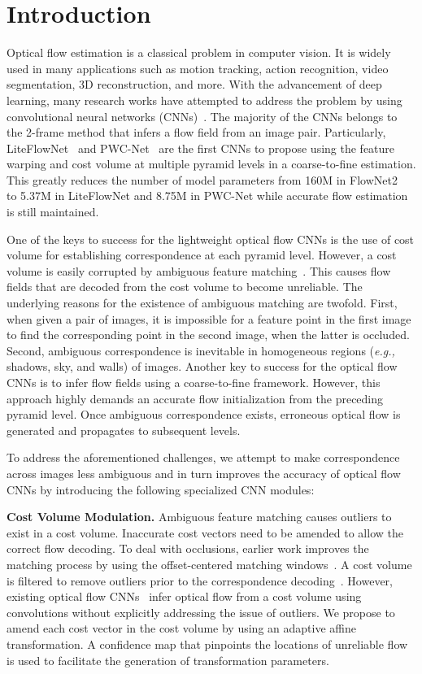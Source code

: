 \documentclass[runningheads]{llncs}
\newcommand{\eg}{\emph{e.g., }}
\begin{document}
\section{Introduction}
Optical flow estimation is a classical problem in computer vision. It is widely used in many applications such as motion tracking, action recognition, video segmentation, 3D reconstruction, and more. 
With the advancement of deep learning, many research works have attempted to address the problem by using convolutional neural networks (CNNs)~\cite{Hui18,Hui20,Hur19,Ilg17,Liu19,Sun18,Sun19,Yang19,Yin19}. The majority of the CNNs belongs to the 2-frame method that infers a flow field from an image pair. 
Particularly, LiteFlowNet~\cite{Hui18} and PWC-Net~\cite{Sun18} are the first CNNs to propose using the feature warping and cost volume at multiple pyramid levels in a coarse-to-fine estimation. This greatly reduces the number of model parameters from 160M in FlowNet2~\cite{Ilg17} to 5.37M in LiteFlowNet and 8.75M in PWC-Net while accurate flow estimation is still maintained.

One of the keys to success for the lightweight optical flow CNNs is the use of cost volume for establishing correspondence at each pyramid level.
However, a cost volume is easily corrupted by ambiguous feature matching~\cite{Kang01,Rhemann11,Xu17}. This causes flow fields that are decoded from the cost volume to become unreliable.
The underlying reasons for the existence of ambiguous matching are twofold.
First, when given a pair of images, it is impossible for a feature point in the first image to find the corresponding point in the second image, when the latter is occluded. 
Second, ambiguous correspondence is inevitable in homogeneous regions (\eg shadows, sky, and walls) of images. 
Another key to success for the optical flow CNNs is to infer flow fields using a coarse-to-fine framework. However, this approach highly demands an accurate flow initialization from the preceding pyramid level. Once ambiguous correspondence exists, erroneous optical flow is generated and propagates to subsequent levels.

To address the aforementioned challenges, we attempt to make correspondence across images less ambiguous and in turn improves the accuracy of optical flow CNNs by introducing the following specialized CNN modules:

\noindent 
\textbf{Cost Volume Modulation.} Ambiguous feature matching causes outliers to exist in a cost volume. Inaccurate cost vectors need to be amended to allow the correct flow decoding.
To deal with occlusions, earlier work improves the matching process by using the offset-centered matching windows~\cite{Kang01}. A cost volume is filtered to remove outliers prior to the correspondence decoding~\cite{Rhemann11,Xu17}. 
However, existing optical flow CNNs~\cite{Hui20,Hur19,Ilg17,Liu19,Sun19,Yin19,Yang19} infer optical flow from a cost volume using convolutions without explicitly addressing the issue of outliers. 
We propose to amend each cost vector in the cost volume by using an adaptive affine transformation. A confidence map that pinpoints the locations of unreliable flow is used to facilitate the generation of transformation parameters. 
\end{document}

